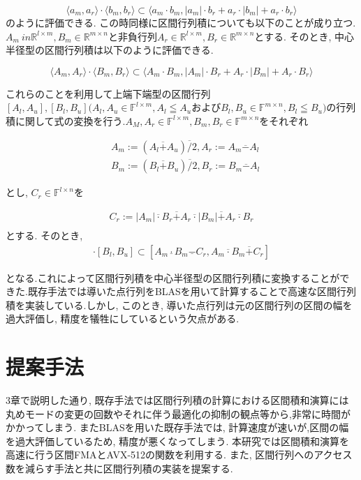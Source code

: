 \documentclass[11pt,a4paper]{jsreport}
\theoremstyle{definition}
\begin{document}
\begin{equation}
\langle a_m,a_r \rangle \cdot \langle b_m,b_r \rangle \subset \langle a_m \cdot b_m, |a_m| \cdot b_r + a_r \cdot |b_m| + a_r \cdot b_r \rangle
\end{equation}
\noindent のように評価できる.
\indent この時同様に区間行列積についても以下のことが成り立つ.$A_m \ in \mathbb{R}^{l \times m}, B_m \in \mathbb{R}^{m \times n}$と非負行列$A_r \in \mathbb{R}^{l \times m}, B_r \in \mathbb{R}^{m \times n}$とする. そのとき, 中心半径型の区間行列積は以下のように評価できる.

\begin{equation}
\langle A_m,A_r \rangle \cdot \langle B_m,B_r \rangle \subset \langle A_m \cdot B_m, |A_m| \cdot B_r + A_r \cdot |B_m| + A_r \cdot B_r \rangle
\end{equation}

\indent これらのことを利用して上端下端型の区間行列$[A_l,A_u],[B_l,B_u](A_l,A_u \in \mathbb{F}^{l \times m},A_l \leqq A_u$および$B_l,B_u \in \mathbb{F}^{m \times n},B_l \leqq B_u)$の行列積に関して式の変換を行う.$A_M,A_r \in \mathbb{F}^{l \times m}, B_m,B_r \in \mathbb{F}^{m \times n}$をそれぞれ

\begin{align*}
&A_m :=(A_l \overline{+} A_u) \overline{/}2,            A_r := A_m \overline{-} A_l \\
&B_m :=(B_l \overline{+} B_u) \overline{/}2,            B_r := B_m \overline{-} A_l
\end{align*}

\noindent とし, $C_r \in \mathbb{F}^{l \times n}$を

\begin{align*}
C_r := |A_m| \overline{\cdot} B_r \overline{+} A_r \overline{\cdot} |B_m| \overline{+} A_r \overline{\cdot} B_r \\
\end{align*}
\noindent とする. そのとき,
\begin{align*}
[A_l,A_u] \cdot [B_l,B_u] \subset [A_m \underline{\cdot} B_m \underline{-} C_r,  A_m \overline{\cdot} B_m \overline{+} C_r]
\end{align*}

となる.これによって区間行列積を中心半径型の区間行列積に変換することができた.既存手法では導いた点行列をBLASを用いて計算することで高速な区間行列積を実装している.しかし, このとき, 導いた点行列は元の区間行列の区間の幅を過大評価し, 精度を犠牲にしているという欠点がある.
\newpage
\chapter{提案手法}
	3章で説明した通り, 既存手法では区間行列積の計算における区間積和演算には丸めモードの変更の回数やそれに伴う最適化の抑制の観点等から,非常に時間がかかってしまう. またBLASを用いた既存手法では, 計算速度が速いが,区間の幅を過大評価しているため, 精度が悪くなってしまう. 本研究では区間積和演算を高速に行う区間FMAとAVX-512の関数を利用する. また, 区間行列へのアクセス数を減らす手法と共に区間行列積の実装を提案する.
\end{document}
